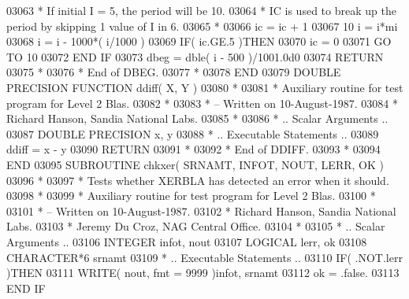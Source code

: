 \begin{DoxyCode}
03063 \textcolor{comment}{*     If initial I = 5, the period will be 10.}
03064 \textcolor{comment}{*     IC is used to break up the period by skipping 1 value of I in 6.}
03065 \textcolor{comment}{*}
03066       ic = ic + 1
03067    10 i = i*mi
03068       i = i - 1000*( i/1000 )
03069       \textcolor{keywordflow}{IF}( ic.GE.5 )\textcolor{keywordflow}{THEN}
03070          ic = 0
03071          \textcolor{keywordflow}{GO TO} 10
03072 \textcolor{keywordflow}{      END IF}
03073       dbeg = dble( i - 500 )/1001.0d0
03074       \textcolor{keywordflow}{RETURN}
03075 \textcolor{comment}{*}
03076 \textcolor{comment}{*     End of DBEG.}
03077 \textcolor{comment}{*}
03078 \textcolor{keyword}{      END}
03079 \textcolor{keyword}{      DOUBLE PRECISION }\textcolor{keyword}{FUNCTION }ddiff( X, Y )
03080 \textcolor{comment}{*}
03081 \textcolor{comment}{*  Auxiliary routine for test program for Level 2 Blas.}
03082 \textcolor{comment}{*}
03083 \textcolor{comment}{*  -- Written on 10-August-1987.}
03084 \textcolor{comment}{*     Richard Hanson, Sandia National Labs.}
03085 \textcolor{comment}{*}
03086 \textcolor{comment}{*     .. Scalar Arguments ..}
03087       \textcolor{keywordtype}{DOUBLE PRECISION}   x, y
03088 \textcolor{comment}{*     .. Executable Statements ..}
03089       ddiff = x - y
03090       \textcolor{keywordflow}{RETURN}
03091 \textcolor{comment}{*}
03092 \textcolor{comment}{*     End of DDIFF.}
03093 \textcolor{comment}{*}
03094 \textcolor{keyword}{      END}
03095 \textcolor{keyword}{      SUBROUTINE }chkxer( SRNAMT, INFOT, NOUT, LERR, OK )
03096 \textcolor{comment}{*}
03097 \textcolor{comment}{*  Tests whether XERBLA has detected an error when it should.}
03098 \textcolor{comment}{*}
03099 \textcolor{comment}{*  Auxiliary routine for test program for Level 2 Blas.}
03100 \textcolor{comment}{*}
03101 \textcolor{comment}{*  -- Written on 10-August-1987.}
03102 \textcolor{comment}{*     Richard Hanson, Sandia National Labs.}
03103 \textcolor{comment}{*     Jeremy Du Croz, NAG Central Office.}
03104 \textcolor{comment}{*}
03105 \textcolor{comment}{*     .. Scalar Arguments ..}
03106       \textcolor{keywordtype}{INTEGER}            infot, nout
03107       \textcolor{keywordtype}{LOGICAL}            lerr, ok
03108       \textcolor{keywordtype}{CHARACTER*6}        srnamt
03109 \textcolor{comment}{*     .. Executable Statements ..}
03110       \textcolor{keywordflow}{IF}( .NOT.lerr )\textcolor{keywordflow}{THEN}
03111          \textcolor{keyword}{WRITE}( nout, fmt = 9999 )infot, srnamt
03112          ok = .false.
03113 \textcolor{keywordflow}{      END IF}

\end{DoxyCode}
